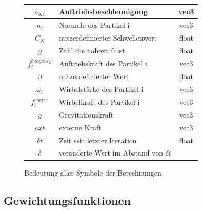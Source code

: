 \documentclass[intern,palatino]{cgBA}
\begin{document}
\begin{figure}[H]
\begin{tabular}{ | c | p{8cm} | c |}
			$a_{b,i} $ 	  		&  Auftriebsbeschleunigung							&	vec3	\\ \hline
			$n_i $ 				&  Normale des Partikel i							&	vec3	\\ \hline
			$C_N $ 				&  nutzerdefinierter Schwellenwert					&	float	\\ \hline
			$y $ 				&  Zahl die nahezu 0 ist					 		&	float	\\ \hline
			$f^{buoyancy}_i $ 	&  Auftriebskraft des Partikel i					&	vec3	\\ \hline
			$\beta $ 			&  nutzerdefinierter Wert							&	float	\\ \hline
			$\omega_i $ 		&  Wirbelstärke des Partikel i						&	vec3	\\ \hline
			$f^{vortex}_i $ 	&  Wirbelkraft des Partikel i						&	vec3	\\ \hline
			$g $ 				&  Gravitationskraft								&	vec3	\\ \hline
			$ext $ 				&  externe Kraft									&	vec3	\\ \hline
			$\delta t $ 		&  Zeit seit letzter Iteration 						&	float	\\ \hline
			$\delta $ 			&  veränderte Wert im Abstand von $\delta t$ 		&			\\
			\hline
		\end{tabular}
	\caption{Bedeutung aller Symbole der Berechnungen}
	\label{tab:Symbole}
\end{figure}


\subsection{Gewichtungsfunktionen}\label{kernel}
\end{document}
